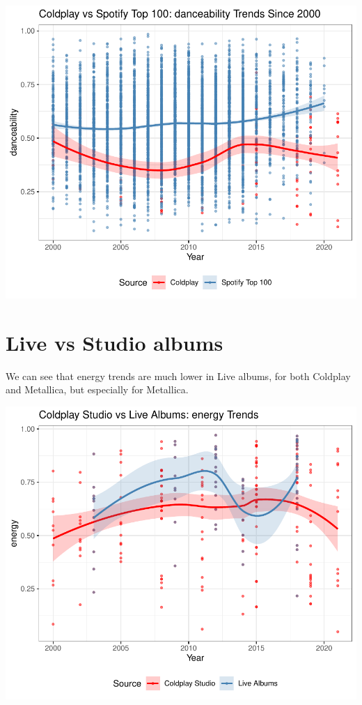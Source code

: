 \documentclass[11pt,preprint]{elsarticle}
\numberwithin{equation}{section}
\numberwithin{figure}{section}
\numberwithin{table}{section}
\begin{document}
\includegraphics{Question2_files/figure-latex/unnamed-chunk-7-1.pdf}

\newpage

\section{Live vs Studio albums}\label{live-vs-studio-albums}

We can see that energy trends are much lower in Live albums, for both
Coldplay and Metallica, but especially for Metallica.

\begin{center}\includegraphics[width=0.8\linewidth]{Question2_files/figure-latex/unnamed-chunk-8-1} \end{center}
\end{document}
